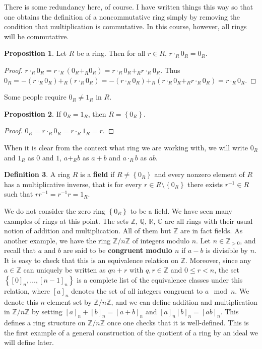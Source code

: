 \documentclass{article}
\newcommand{\Z}{\mathbb{Z}}
\newcommand{\Q}{\mathbb{Q}}
\newcommand{\R}{\mathbb{R}}
\newcommand{\C}{\mathbb{C}}
\newcommand{\rb}[1]{\left( #1 \right)}
\renewcommand{\sb}[1]{\left[ #1 \right]}
\newcommand{\cb}[1]{\left\{ #1 \right\}}
\theoremstyle{definition}\newtheorem{definition}{Definition}[section]
\theoremstyle{definition}\newtheorem{remark}[definition]{Remark}
\theoremstyle{definition}\newtheorem*{example}{Example}
\theoremstyle{definition}\newtheorem*{note}{Note}
\newtheorem{proposition}[definition]{Proposition}
\begin{document}
There is some redundancy here, of course. I have written things this way so that one obtains the definition of a noncommutative ring simply by removing the condition that multiplication is commutative. In this course, however, all rings will be commutative.

\begin{proposition}
Let $ R $ be a ring. Then for all $ r \in R $, $ r \cdot_R 0_R = 0_R $.
\end{proposition}

\begin{proof}
$ r \cdot_R 0_R = r \cdot_R \rb{0_R +_R 0_R} = r \cdot_R 0_R +_R r \cdot_R 0_R $. Thus $ 0_R = -\rb{r \cdot_R 0_R} +_R \rb{r \cdot_R 0_R} = -\rb{r \cdot_R 0_R} +_R \rb{r \cdot_R 0_R +_R r \cdot_R 0_R} = r \cdot_R 0_R $.
\end{proof}

Some people require $ 0_R \ne 1_R $ in $ R $.

\begin{proposition}
If $ 0_R = 1_R $, then $ R = \cb{0_R} $.
\end{proposition}

\begin{proof}
$ 0_R = r \cdot_R 0_R = r \cdot_R 1_R = r $.
\end{proof}

When it is clear from the context what ring we are working with, we will write $ 0_R $ and $ 1_R $ as $ 0 $ and $ 1 $, $ a +_R b $ as $ a + b $ and $ a \cdot_R b $ as $ ab $.

\begin{definition}
A ring $ R $ is a \textbf{field} if $ R \ne \cb{0_R} $ and every nonzero element of $ R $ has a multiplicative inverse, that is for every $ r \in R \setminus \cb{0_R} $ there exists $ r^{-1} \in R $ such that $ rr^{-1} = r^{-1}r = 1_R $.
\end{definition}

We do not consider the zero ring $ \cb{0_R} $ to be a field. We have seen many examples of rings at this point. The sets $ \Z $, $ \Q $, $ \R $, $ \C $ are all rings with their usual notion of addition and multiplication. All of them but $ \Z $ are in fact fields. As another example, we have the ring $ \Z / n\Z $ of integers modulo $ n $. Let $ n \in \Z_{> 0} $, and recall that $ a $ and $ b $ are said to be \textbf{congruent modulo $ n $} if $ a - b $ is divisible by $ n $. It is easy to check that this is an equivalence relation on $ \Z $. Moreover, since any $ a \in \Z $ can uniquely be written as $ qn + r $ with $ q, r \in \Z $ and $ 0 \le r < n $, the set $ \cb{\sb{0}_n, \dots, \sb{n - 1}_n} $ is a complete list of the equivalence classes under this relation, where $ \sb{a}_n $ denotes the set of all integers congruent to $ a \mod n $. We denote this $ n $-element set by $ \Z / n\Z $, and we can define addition and multiplication in $ \Z / n\Z $ by setting $ \sb{a}_n + \sb{b}_n = \sb{a + b}_n $ and $ \sb{a}_n\sb{b}_n = \sb{ab}_n $. This defines a ring structure on $ \Z / n\Z $ once one checks that it is well-defined. This is the first example of a general construction of the quotient of a ring by an ideal we will define later.
\end{document}
